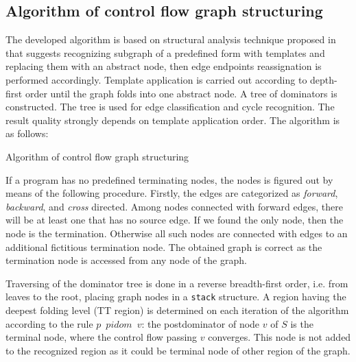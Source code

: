 \documentclass[conference]{IEEEtran}
\begin{document}
\subsection{Algorithm of control flow graph structuring}
\label{sec:algor-contr-flow}

The developed algorithm is based on structural analysis technique proposed in~\cite{17} that suggests recognizing subgraph of a predefined form with templates and replacing them with an abstract node, then edge endpoints reassignation is performed accordingly.  Template application is carried out according to depth-first order until the graph folds into one abstract node.  A tree of dominators is constructed.  The tree is used for edge classification and cycle recognition.  The result quality strongly depends on template application order.  The algorithm is as follows:

\begin{algorithm}[h]
\caption{Algorithm of control flow graph structuring}
\label{alg:struct}
\SetAlgoLined %
\end{algorithm}


If a program has no predefined terminating nodes, the nodes is figured out by means of the following procedure.  Firstly, the edges are categorized as \emph{forward}, \emph{backward}, and \emph{cross} directed.  Among nodes connected with forward edges, there will be at least one that has no source edge.  If we found the only node, then the node is the termination.  Otherwise all such nodes are connected with edges to an additional fictitious termination node.  The obtained graph is correct as the termination node is accessed from any node of the graph.

Traversing of the dominator tree is done in a reverse breadth-first order, i.e. from leaves to the root, placing graph nodes in a \texttt{stack} structure.  A region having the deepest folding level (TT region) is determined on each iteration of the algorithm according to the rule $p$~$pidom$~$v$: the postdominator of node $v$ of $S$ is the terminal node, where the control flow passing $v$ converges.  This node is not added to the recognized region as it could be terminal node of other region of the graph.
\end{document}
